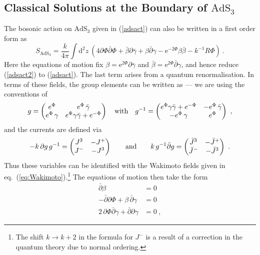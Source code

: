\documentclass[12pt,a4paper]{article}
\newcommand{\be}{\begin{equation}}
\newcommand{\ee}{\end{equation}}
\begin{document}
\subsection{Classical Solutions at the Boundary of \texorpdfstring{$\text{AdS}_3$}{AdS3}} \label{subsec:classical sol}


The bosonic action on $\text{AdS}_3$ given in (\ref{adsact}) 
can also be written in a first order form as
\be\label{adsact2}
S_{\mathrm{AdS}_3}= \frac{k}{4\pi} \int \mathrm{d}^2 z\  (4 \partial \Phi \bar{\partial} \Phi  +\bar \beta\partial  \bar{\gamma} +\beta \bar{\partial}  \gamma - \mathrm{e}^{-2\Phi} \beta \bar\beta-k^{-1} R \Phi)  \ . 
\ee
Here the equations of motion fix $\beta =\mathrm{e}^{2\Phi}\partial  \bar{\gamma}$ and $\bar\beta =\mathrm{e}^{2\Phi} \bar\partial  \gamma$, and hence reduce (\ref{adsact2}) to (\ref{adsact}). The last term arises from a quantum renormalisation. In terms of these fields, the group elements can be written as --- we are using the conventions of \cite{Ponsot:2001gt}
\be\label{gdef}
g = \left( \begin{matrix} e^{\Phi} &  e^{\Phi}\, \bar{\gamma} \\ 
 e^{\Phi} \, \gamma & e^{\Phi} \gamma \bar{\gamma} + e^{-\Phi} \end{matrix} \right) \quad \hbox{with} \quad 
g^{-1}  = \left( \begin{matrix} e^{\Phi} \gamma \bar{\gamma} + e^{-\Phi}  & 
- e^{\Phi} \, \bar{\gamma} \\  - e^{\Phi} \, \gamma & e^{\Phi} \end{matrix} \right)  \ , 
\ee
and the currents are defined via 
\be
- k\, \partial g \, g^{-1} =  \left( \begin{matrix}  J^3 &  - J^+ \\   J^- & - J^3 \end{matrix} \right) \qquad \hbox{and} \qquad 
k\, g^{-1} \bar\partial g   =  \left( \begin{matrix}  \bar{J}^3 &  - \bar{J}^+ \\   \bar{J}^- & - \bar{J}^3 \end{matrix} \right) \ .
\ee 
Thus  these variables can be identified with the Wakimoto fields given in eq.~(\ref{eq:Wakimoto}).\footnote{The shift $k \to k+2$ in the formula for $J^-$ is a result of a correction in the quantum theory due to normal ordering.} The equations of motion then take the form 
\begin{subequations}
\begin{align}
\bar\partial \beta & =   0 \\ 
-\bar\partial \partial \Phi + \beta \, \bar\partial \gamma & =  0 \label{2nd} \\
2\, \partial\Phi \bar\partial\gamma + \bar\partial\partial\gamma & =  0 \ , \label{3rd}
\end{align}
\end{subequations}
\end{document}
